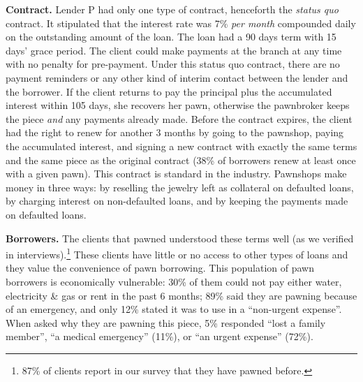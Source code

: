 \documentclass[ecta,nameyear,final]{econsocart}
\begin{document}
\noindent \textbf{Contract.} Lender P had only one type of contract, henceforth the \textit{status quo} contract. It stipulated that the interest rate was 7\% \textit{per month} compounded daily on the outstanding amount of the loan. The loan had a 90 days term with 15 days' grace period. The client could make payments at the branch at any time with no penalty for pre-payment. Under this status quo contract, there are no payment reminders or any other kind of interim contact between the lender and the borrower. If the client returns to pay the principal plus the accumulated interest within 105 days, she recovers her pawn, otherwise the pawnbroker keeps the piece \textit{and} any payments already made. Before the contract expires, the client had the right to renew for another 3 months by going to the pawnshop, paying the accumulated interest, and signing a new contract with exactly the same terms and the same piece as the original contract (38\% of borrowers renew at least once with a given pawn). This contract is standard in the industry.  Pawnshops make money in three ways: by reselling the jewelry left as collateral on defaulted loans, by charging interest on non-defaulted loans, and by keeping the payments made on defaulted loans. 

\noindent \textbf{Borrowers.} The clients that pawned understood these terms well (as we verified in interviews).\footnote{87\% of clients report in our survey that they have pawned before.} These clients have little or no access to other types of loans and they value the convenience of pawn borrowing.  This population of pawn borrowers is economically vulnerable:  30\% of them could not pay either water, electricity \& gas or rent in the past 6 months; 89\% said they are pawning because of an emergency, and only 12\% stated it was to use in a ``non-urgent expense''.  When asked why they are pawning this piece, 5\% responded ``lost a family member'', ``a medical emergency'' (11\%), or ``an urgent expense'' (72\%).
\end{document}
